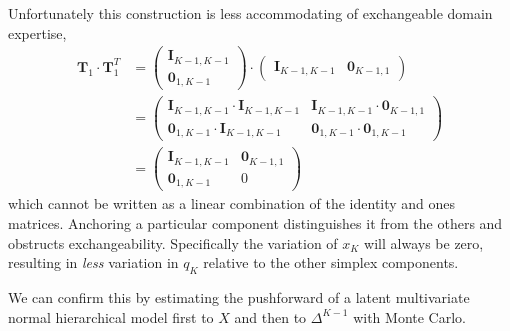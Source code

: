 \documentclass[
  letterpaper,
  DIV=11,
  numbers=noendperiod]{scrartcl}
\begin{document}
Unfortunately this construction is less accommodating of exchangeable
domain expertise, \begin{align*}
\mathbf{T}_{1} \cdot \mathbf{T}_{1}^{T}
&=
\begin{pmatrix}
\mathbf{I}_{K - 1, K - 1} \\
\mathbf{0}_{1, K - 1}
\end{pmatrix}
\cdot
\begin{pmatrix}
\mathbf{I}_{K - 1, K - 1} &
\mathbf{0}_{K - 1, 1}
\end{pmatrix}
\\
&=
\begin{pmatrix}
\mathbf{I}_{K - 1, K - 1} \cdot \mathbf{I}_{K - 1, K - 1} &
\mathbf{I}_{K - 1, K - 1} \cdot \mathbf{0}_{K - 1, 1} \\
\mathbf{0}_{1, K - 1} \cdot \mathbf{I}_{K - 1, K - 1} &
\mathbf{0}_{1, K - 1} \cdot \mathbf{0}_{1, K - 1}
\end{pmatrix}
\\
&=
\begin{pmatrix}
\mathbf{I}_{K - 1, K - 1} &
\mathbf{0}_{K - 1, 1} \\
\mathbf{0}_{1, K - 1} &
0
\end{pmatrix}
\end{align*} which cannot be written as a linear combination of the
identity and ones matrices. Anchoring a particular component
distinguishes it from the others and obstructs exchangeability.
Specifically the variation of \(x_{K}\) will always be zero, resulting
in \emph{less} variation in \(q_{K}\) relative to the other simplex
components.

We can confirm this by estimating the pushforward of a latent
multivariate normal hierarchical model first to \(X\) and then to
\(\Delta^{K - 1}\) with Monte Carlo.
\end{document}
